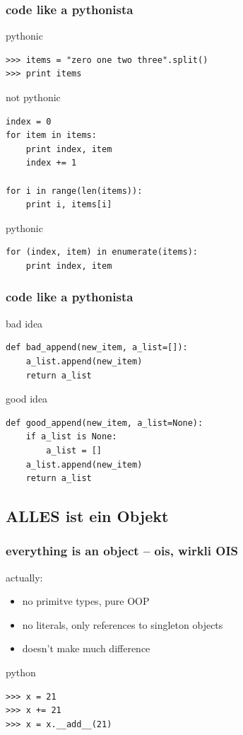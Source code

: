 \documentclass{beamer}
\begin{document}
\begin{frame}[fragile]
	\frametitle{code like a pythonista}

	\begin{exampleblock}{pythonic}
	\begin{lstlisting}
>>> items = "zero one two three".split()
>>> print items
    \end{lstlisting}
	\end{exampleblock}
\pause
	\begin{alertblock}{not pythonic}
	\begin{lstlisting}
index = 0
for item in items:
    print index, item
    index += 1

for i in range(len(items)):
    print i, items[i]
    \end{lstlisting}
	\end{alertblock}
\pause	
	\begin{exampleblock}{pythonic}
    \begin{lstlisting}
for (index, item) in enumerate(items):
    print index, item
    \end{lstlisting}
	\end{exampleblock}
\end{frame}

\begin{frame}[fragile]
	\frametitle{code like a pythonista}
	
	\begin{alertblock}{bad idea}
	\begin{lstlisting} 
def bad_append(new_item, a_list=[]):
    a_list.append(new_item)
    return a_list
    \end{lstlisting}%
	\end{alertblock}
\pause
	\begin{exampleblock}{good idea}
	\begin{lstlisting}
def good_append(new_item, a_list=None):
    if a_list is None:
        a_list = []
    a_list.append(new_item)
    return a_list
    \end{lstlisting}
	\end{exampleblock}
\end{frame}


\subsection{ALLES ist ein Objekt}

\begin{frame}[fragile]
	\frametitle{everything is an object -- ois, wirkli OIS}
	actually:
	\begin{itemize}
	\item no primitve types, pure OOP
	\item no literals, only references to singleton objects
	\item doesn't make much difference
	\end{itemize}
	\begin{exampleblock}{python}
	\begin{lstlisting}
>>> x = 21
>>> x += 21
>>> x = x.__add__(21)
	\end{lstlisting}
	\end{exampleblock}
\end{frame}
\end{document}
